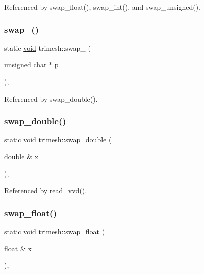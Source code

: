 Referenced by swap\+\_\+float(), swap\+\_\+int(), and swap\+\_\+unsigned().

\mbox{\label{namespacetrimesh_adc950fdeb642770e3588340efe3e5a91}} 
\subsubsection{\texorpdfstring{swap\+\_()}{swap\_64()}}
{\footnotesize\ttfamily static \hyperlink{namespacetrimesh_a784ddfd979e1c579bda795a8edfc3f43}{void} trimesh\+::swap\+\_ (\begin{DoxyParamCaption}\item[{unsigned char $\ast$}]{p }\end{DoxyParamCaption})\hspace{0.3cm}{\ttfamily [inline]}, {\ttfamily [static]}}



Referenced by swap\+\_\+double().

\mbox{\label{namespacetrimesh_a8faa7aac5ffa5cc16f4512eef7dc2b65}} 
\subsubsection{\texorpdfstring{swap\+\_\+double()}{swap\_double()}}
{\footnotesize\ttfamily static \hyperlink{namespacetrimesh_a784ddfd979e1c579bda795a8edfc3f43}{void} trimesh\+::swap\+\_\+double (\begin{DoxyParamCaption}\item[{double \&}]{x }\end{DoxyParamCaption})\hspace{0.3cm}{\ttfamily [inline]}, {\ttfamily [static]}}



Referenced by read\+\_\+vvd().

\mbox{\label{namespacetrimesh_a58233e99696f056c2c5c581c7c2d3a5e}} 
\subsubsection{\texorpdfstring{swap\+\_\+float()}{swap\_float()}}
{\footnotesize\ttfamily static \hyperlink{namespacetrimesh_a784ddfd979e1c579bda795a8edfc3f43}{void} trimesh\+::swap\+\_\+float (\begin{DoxyParamCaption}\item[{float \&}]{x }\end{DoxyParamCaption})\hspace{0.3cm}{\ttfamily [inline]}, {\ttfamily [static]}}



